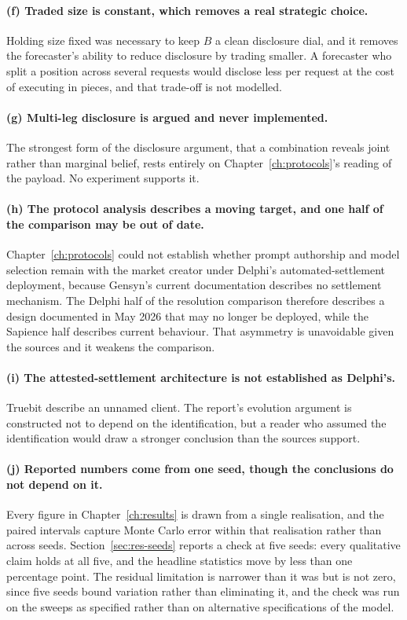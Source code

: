 \paragraph{(f) Traded size is constant, which removes a real strategic choice.} Holding size
fixed was necessary to keep $B$ a clean disclosure dial, and it removes the forecaster's
ability to reduce disclosure by trading smaller. A forecaster who split a position across
several requests would disclose less per request at the cost of executing in pieces, and
that trade-off is not modelled.

\paragraph{(g) Multi-leg disclosure is argued and never implemented.} The strongest form of
the disclosure argument, that a combination reveals joint rather than marginal belief, rests
entirely on Chapter~\ref{ch:protocols}'s reading of the payload. No experiment supports it.

\paragraph{(h) The protocol analysis describes a moving target, and one half of the
comparison may be out of date.} Chapter~\ref{ch:protocols} could not establish whether
prompt authorship and model selection remain with the market creator under Delphi's
automated-settlement deployment, because Gensyn's current documentation describes no
settlement mechanism. The Delphi half of the resolution comparison therefore describes a
design documented in May 2026 that may no longer be deployed, while the Sapience half
describes current behaviour. That asymmetry is unavoidable given the sources and it weakens
the comparison.

\paragraph{(i) The attested-settlement architecture is not established as Delphi's.} Truebit
describe an unnamed client. The report's evolution argument is constructed not to depend on
the identification, but a reader who assumed the identification would draw a stronger
conclusion than the sources support.

\paragraph{(j) Reported numbers come from one seed, though the conclusions do not depend on
it.} Every figure in Chapter~\ref{ch:results} is drawn from a single realisation, and the
paired intervals capture Monte Carlo error within that realisation rather than across seeds.
Section~\ref{sec:res-seeds} reports a check at five seeds: every qualitative claim holds at
all five, and the headline statistics move by less than one percentage point. The residual
limitation is narrower than it was but is not zero, since five seeds bound variation rather
than eliminating it, and the check was run on the sweeps as specified rather than on
alternative specifications of the model.

